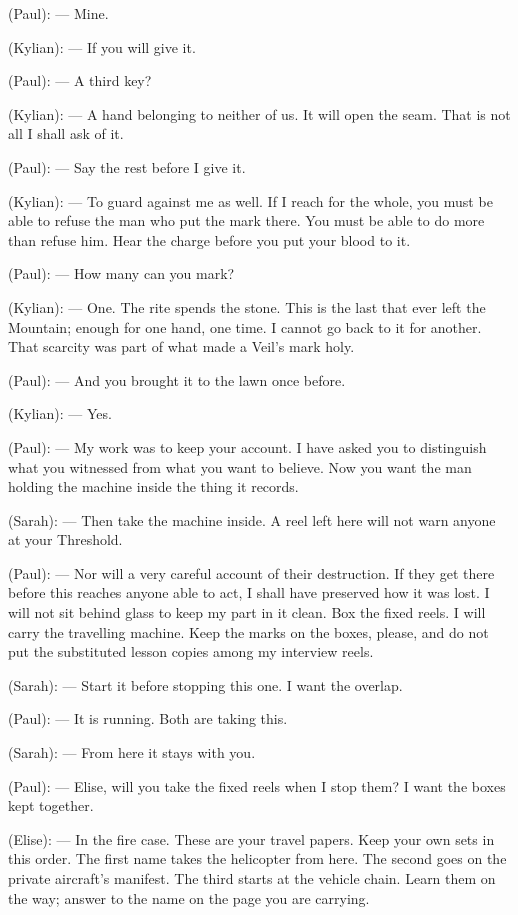 \begin{room}
(Paul): --- Mine.

(Kylian): --- If you will give it.

(Paul): --- A third key?

(Kylian): --- A hand belonging to neither of us. It will open the seam. That is not all I shall ask of it.

(Paul): --- Say the rest before I give it.

(Kylian): --- To guard against me as well. If I reach for the whole, you must be able to refuse the man who put the mark there. You must be able to do more than refuse him. Hear the charge before you put your blood to it.

(Paul): --- How many can you mark?

(Kylian): --- One. The rite spends the stone. This is the last that ever left the Mountain; enough for one hand, one time. I cannot go back to it for another. That scarcity was part of what made a Veil's mark holy.

(Paul): --- And you brought it to the lawn once before.

(Kylian): --- Yes.

(Paul): --- My work was to keep your account. I have asked you to distinguish what you witnessed from what you want to believe. Now you want the man holding the machine inside the thing it records.

(Sarah): --- Then take the machine inside. A reel left here will not warn anyone at your Threshold.

(Paul): --- Nor will a very careful account of their destruction. If they get there before this reaches anyone able to act, I shall have preserved how it was lost. I will not sit behind glass to keep my part in it clean. Box the fixed reels. I will carry the travelling machine. Keep the marks on the boxes, please, and do not put the substituted lesson copies among my interview reels.

(Sarah): --- Start it before stopping this one. I want the overlap.

(Paul): --- It is running. Both are taking this.

(Sarah): --- From here it stays with you.

(Paul): --- Elise, will you take the fixed reels when I stop them? I want the boxes kept together.

(Elise): --- In the fire case. These are your travel papers. Keep your own sets in this order. The first name takes the helicopter from here. The second goes on the private aircraft's manifest. The third starts at the vehicle chain. Learn them on the way; answer to the name on the page you are carrying.


\end{room}
